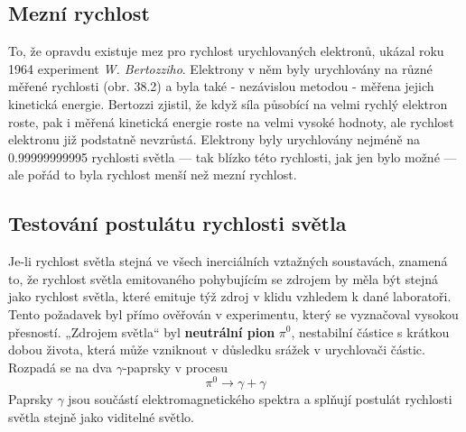      \subsection{Mezní rychlost}
        To, že opravdu existuje mez pro rychlost urychlovaných elektronů, ukázal roku 1964
        experiment \emph{W. Bertozziho}. Elektrony v něm byly urychlovány na různé měřené rychlosti
        (obr. 38.2) a byla také - nezávislou metodou - měřena jejich kinetická energie. Bertozzi
        zjistil, že když síla působící na velmi rychlý elektron roste, pak i měřená kinetická
        energie roste na velmi vysoké hodnoty, ale rychlost elektronu již podstatně nevzrůstá.
        Elektrony byly urychlovány nejméně na \num{0.999 999 999 95} rychlosti světla — tak blízko
        této rychlosti, jak jen bylo možné — ale pořád to byla rychlost menší než mezní rychlost.


      \subsection{Testování postulátu rychlosti světla}  
        Je-li rychlost světla stejná ve všech inerciálních vztažných soustavách, znamená to, že
        rychlost světla emitovaného pohybujícím se zdrojem by měla být stejná jako rychlost světla,
        které emituje týž zdroj v klidu vzhledem k dané laboratoři. Tento požadavek byl přímo
        ověřován v experimentu, který se vyznačoval vysokou přesností. „Zdrojem světla“ byl
        \textbf{neutrální pion} \(\pi^0\), nestabilní částice s krátkou dobou života, která může
        vzniknout v důsledku srážek v urychlovači částic. Rozpadá se na dva \(\gamma\)-paprsky v
        procesu
        \begin{equation*}
          \pi^0 \rightarrow \gamma + \gamma
        \end{equation*}
        Paprsky \(\gamma\) jsou součástí elektromagnetického spektra a splňují postulát rychlosti
        světla stejně jako viditelné světlo.

